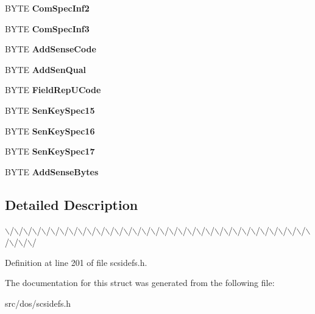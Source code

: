 \begin{DoxyCompactItemize}
\item 
\hypertarget{structSENSE__DATA__FMT_a23e29da4db0aa36222572d43babf3efd}{B\-Y\-T\-E {\bfseries Com\-Spec\-Inf2}}\label{structSENSE__DATA__FMT_a23e29da4db0aa36222572d43babf3efd}

\item 
\hypertarget{structSENSE__DATA__FMT_acf35d0eba7e52c249064d985c4e2a55f}{B\-Y\-T\-E {\bfseries Com\-Spec\-Inf3}}\label{structSENSE__DATA__FMT_acf35d0eba7e52c249064d985c4e2a55f}

\item 
\hypertarget{structSENSE__DATA__FMT_a488ce31ec8ba4f143b97123093c92375}{B\-Y\-T\-E {\bfseries Add\-Sense\-Code}}\label{structSENSE__DATA__FMT_a488ce31ec8ba4f143b97123093c92375}

\item 
\hypertarget{structSENSE__DATA__FMT_a0524bde9c8a5df1248537f9b0445bb13}{B\-Y\-T\-E {\bfseries Add\-Sen\-Qual}}\label{structSENSE__DATA__FMT_a0524bde9c8a5df1248537f9b0445bb13}

\item 
\hypertarget{structSENSE__DATA__FMT_a814dc6c92204caeef507f2b83f4207a6}{B\-Y\-T\-E {\bfseries Field\-Rep\-U\-Code}}\label{structSENSE__DATA__FMT_a814dc6c92204caeef507f2b83f4207a6}

\item 
\hypertarget{structSENSE__DATA__FMT_a769037dd4a43d5b6623f67fa418419cb}{B\-Y\-T\-E {\bfseries Sen\-Key\-Spec15}}\label{structSENSE__DATA__FMT_a769037dd4a43d5b6623f67fa418419cb}

\item 
\hypertarget{structSENSE__DATA__FMT_ab521623bbeb90b9f5841e20dd84693dd}{B\-Y\-T\-E {\bfseries Sen\-Key\-Spec16}}\label{structSENSE__DATA__FMT_ab521623bbeb90b9f5841e20dd84693dd}

\item 
\hypertarget{structSENSE__DATA__FMT_a9843c79186441877c4a8b1a4aa66ad85}{B\-Y\-T\-E {\bfseries Sen\-Key\-Spec17}}\label{structSENSE__DATA__FMT_a9843c79186441877c4a8b1a4aa66ad85}

\item 
\hypertarget{structSENSE__DATA__FMT_a552949d72fc7c30bb72cf57c9b727548}{B\-Y\-T\-E {\bfseries Add\-Sense\-Bytes}}\label{structSENSE__DATA__FMT_a552949d72fc7c30bb72cf57c9b727548}

\end{DoxyCompactItemize}


\subsection{Detailed Description}
$\backslash$/$\backslash$/$\backslash$/$\backslash$/$\backslash$/$\backslash$/$\backslash$/$\backslash$/$\backslash$/$\backslash$/$\backslash$/$\backslash$/$\backslash$/$\backslash$/$\backslash$/$\backslash$/$\backslash$/$\backslash$/$\backslash$/$\backslash$/$\backslash$/$\backslash$/$\backslash$/$\backslash$/$\backslash$/$\backslash$/$\backslash$/$\backslash$/$\backslash$/$\backslash$/$\backslash$/$\backslash$/$\backslash$/$\backslash$/$\backslash$/$\backslash$/$\backslash$/ 

Definition at line 201 of file scsidefs.\-h.



The documentation for this struct was generated from the following file\-:\begin{DoxyCompactItemize}
\item 
src/dos/scsidefs.\-h\end{DoxyCompactItemize}
